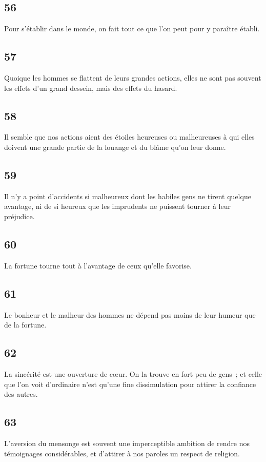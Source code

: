 \documentclass[french,twoside]{book} %
\begin{document}
\subsection[{56}]{ \textsc{56} }
\noindent Pour s’établir dans le monde, on fait tout ce que l’on peut pour y paraître établi.
\subsection[{57}]{ \textsc{57} }
\noindent Quoique les hommes se flattent de leurs grandes actions, elles ne sont pas souvent les effets d’un grand dessein, mais des effets du hasard.
\subsection[{58}]{ \textsc{58} }
\noindent Il semble que nos actions aient des étoiles heureuses ou malheureuses à qui elles doivent une grande partie de la louange et du blâme qu’on leur donne.
\subsection[{59}]{ \textsc{59} }
\noindent Il n’y a point d’accidents si malheureux dont les habiles gens ne tirent quelque avantage, ni de si heureux que les imprudents ne puissent tourner à leur préjudice.
\subsection[{60}]{ \textsc{60} }
\noindent La fortune tourne tout à l’avantage de ceux qu’elle favorise.
\subsection[{61}]{ \textsc{61} }
\noindent Le bonheur et le malheur des hommes ne dépend pas moins de leur humeur que de la fortune.
\subsection[{62}]{ \textsc{62} }
\noindent La sincérité est une ouverture de cœur. On la trouve en fort peu de gens ; et celle que l’on voit d’ordinaire n’est qu’une fine dissimulation pour attirer la confiance des autres.
\subsection[{63}]{ \textsc{63} }
\noindent L’aversion du mensonge est souvent une imperceptible ambition de rendre nos témoignages considérables, et d’attirer à nos paroles un respect de religion.
\end{document}

